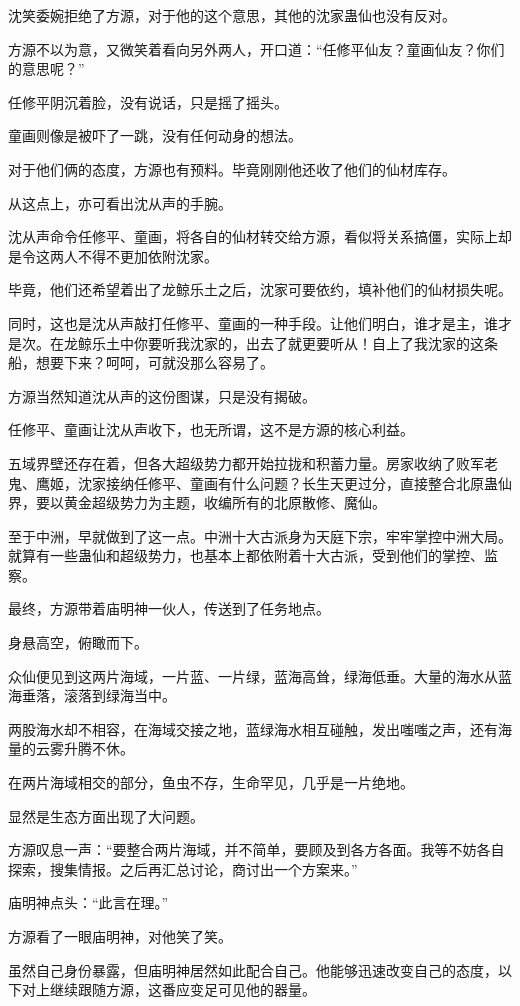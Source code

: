 \begin{this_body}
沈笑委婉拒绝了方源，对于他的这个意思，其他的沈家蛊仙也没有反对。

方源不以为意，又微笑着看向另外两人，开口道：“任修平仙友？童画仙友？你们的意思呢？”

任修平阴沉着脸，没有说话，只是摇了摇头。

童画则像是被吓了一跳，没有任何动身的想法。

对于他们俩的态度，方源也有预料。毕竟刚刚他还收了他们的仙材库存。

从这点上，亦可看出沈从声的手腕。

沈从声命令任修平、童画，将各自的仙材转交给方源，看似将关系搞僵，实际上却是令这两人不得不更加依附沈家。

毕竟，他们还希望着出了龙鲸乐土之后，沈家可要依约，填补他们的仙材损失呢。

同时，这也是沈从声敲打任修平、童画的一种手段。让他们明白，谁才是主，谁才是次。在龙鲸乐土中你要听我沈家的，出去了就更要听从！自上了我沈家的这条船，想要下来？呵呵，可就没那么容易了。

方源当然知道沈从声的这份图谋，只是没有揭破。

任修平、童画让沈从声收下，也无所谓，这不是方源的核心利益。

五域界壁还存在着，但各大超级势力都开始拉拢和积蓄力量。房家收纳了败军老鬼、鹰姬，沈家接纳任修平、童画有什么问题？长生天更过分，直接整合北原蛊仙界，要以黄金超级势力为主题，收编所有的北原散修、魔仙。

至于中洲，早就做到了这一点。中洲十大古派身为天庭下宗，牢牢掌控中洲大局。就算有一些蛊仙和超级势力，也基本上都依附着十大古派，受到他们的掌控、监察。

最终，方源带着庙明神一伙人，传送到了任务地点。

身悬高空，俯瞰而下。

众仙便见到这两片海域，一片蓝、一片绿，蓝海高耸，绿海低垂。大量的海水从蓝海垂落，滚落到绿海当中。

两股海水却不相容，在海域交接之地，蓝绿海水相互碰触，发出嗤嗤之声，还有海量的云雾升腾不休。

在两片海域相交的部分，鱼虫不存，生命罕见，几乎是一片绝地。

显然是生态方面出现了大问题。

方源叹息一声：“要整合两片海域，并不简单，要顾及到各方各面。我等不妨各自探索，搜集情报。之后再汇总讨论，商讨出一个方案来。”

庙明神点头：“此言在理。”

方源看了一眼庙明神，对他笑了笑。

虽然自己身份暴露，但庙明神居然如此配合自己。他能够迅速改变自己的态度，以下对上继续跟随方源，这番应变足可见他的器量。


\end{this_body}

